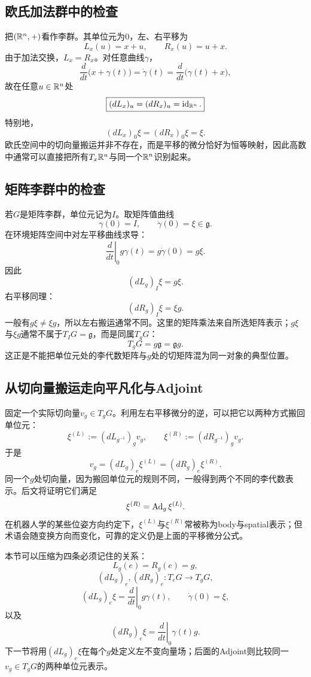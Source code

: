\subsection{欧氏加法群中的检查}

把$(\mathbb{R}^n,+)$看作李群。其单位元为$0$，左、右平移为
\[
    L_x(u)=x+u,
    \qquad
    R_x(u)=u+x.
\]
由于加法交换，$L_x=R_x$。对任意曲线$\gamma$，
\[
    \frac{d}{dt}\bigl(x+\gamma(t)\bigr)
    =\dot\gamma(t)
    =\frac{d}{dt}\bigl(\gamma(t)+x\bigr),
\]
故在任意$u\in\mathbb{R}^n$处
\[
    \boxed{
    (dL_x)_u=(dR_x)_u
    =\operatorname{id}_{\mathbb{R}^n}.
    }
\]
特别地，
\[
    (dL_x)_0\xi
    =(dR_x)_0\xi
    =\xi.
\]
欧氏空间中的切向量搬运并非不存在，而是平移的微分恰好为恒等映射，因此高数中通常可以直接把所有$T_x\mathbb{R}^n$与同一个$\mathbb{R}^n$识别起来。

\subsection{矩阵李群中的检查}

若$G$是矩阵李群，单位元记为$I$。取矩阵值曲线
\[
    \gamma(0)=I,
    \qquad
    \dot\gamma(0)=\xi\in\mathfrak g.
\]
在环境矩阵空间中对左平移曲线求导：
\[
    \left.\frac{d}{dt}\right|_0g\gamma(t)
    =g\dot\gamma(0)
    =g\xi.
\]
因此
\[
    \boxed{
    (dL_g)_I\xi=g\xi.
    }
\]
右平移同理：
\[
    \boxed{
    (dR_g)_I\xi=\xi g.
    }
\]
一般有$g\xi\neq\xi g$，所以左右搬运通常不同。这里的矩阵乘法来自所选矩阵表示；$g\xi$与$\xi g$通常不属于$T_IG=\mathfrak g$，而是同属$T_gG$：
\[
    T_gG=g\mathfrak g=\mathfrak g g.
\]
这正是不能把单位元处的李代数矩阵与$g$处的切矩阵混为同一对象的典型位置。

\subsection{从切向量搬运走向平凡化与Adjoint}

固定一个实际切向量$v_g\in T_gG$。利用左右平移微分的逆，可以把它以两种方式搬回单位元：
\[
    \xi^{(L)}
    :=(dL_{g^{-1}})_g v_g,
    \qquad
    \xi^{(R)}
    :=(dR_{g^{-1}})_g v_g.
\]
于是
\[
    \boxed{
    v_g
    =(dL_g)_e\xi^{(L)}
    =(dR_g)_e\xi^{(R)}.
    }
\]
同一个$g$处切向量，因为搬回单位元的规则不同，一般得到两个不同的李代数表示。后文将证明它们满足
\[
    \xi^{(R)}=\operatorname{Ad}_g\xi^{(L)}.
\]
在机器人学的某些位姿方向约定下，$\xi^{(L)}$与$\xi^{(R)}$常被称为body与spatial表示；但术语会随变换方向而变化，可靠的定义仍是上面的平移微分公式。

本节可以压缩为四条必须记住的关系：
\[
    L_g(e)=R_g(e)=g,
\]
\[
    (dL_g)_e,(dR_g)_e:T_eG\to T_gG,
\]
\[
    (dL_g)_e\xi
    =\left.\frac{d}{dt}\right|_0g\gamma(t),
    \qquad
    \dot\gamma(0)=\xi,
\]
以及
\[
    (dR_g)_e\xi
    =\left.\frac{d}{dt}\right|_0\gamma(t)g.
\]
下一节将用$(dL_g)_e\xi$在每个$g$处定义左不变向量场；后面的Adjoint则比较同一$v_g\in T_gG$的两种单位元表示。

